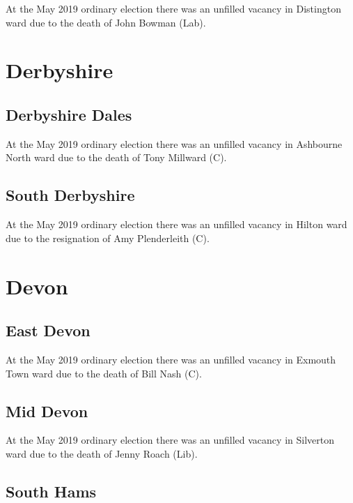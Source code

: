 \documentclass[a4paper,openany]{book}
\begin{document}
\begin{resultsiii}
At the May 2019 ordinary election there was an unfilled vacancy in Distington ward due to the death of John Bowman (Lab).

\section{Derbyshire}

\subsection*{Derbyshire Dales}

At the May 2019 ordinary election there was an unfilled vacancy in Ashbourne North ward due to the death of Tony Millward (C).

\subsection*{South Derbyshire}

At the May 2019 ordinary election there was an unfilled vacancy in Hilton ward due to the resignation of Amy Plenderleith (C).

\section{Devon}

\subsection*{East Devon}

At the May 2019 ordinary election there was an unfilled vacancy in Exmouth Town ward due to the death of Bill Nash (C).

\subsection*{Mid Devon}

At the May 2019 ordinary election there was an unfilled vacancy in Silverton ward due to the death of Jenny Roach (Lib).

\subsection*{South Hams}


\end{resultsiii}
\end{document}
